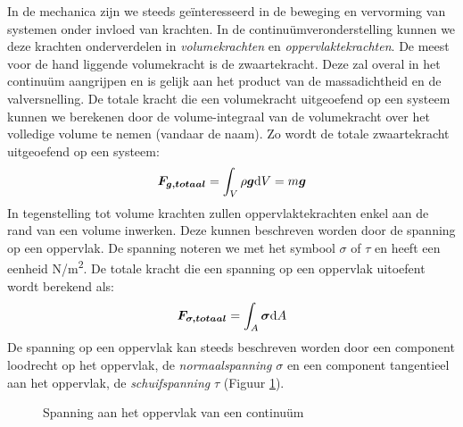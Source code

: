 In de mechanica zijn we steeds geïnteresseerd in de beweging en vervorming van systemen onder invloed van krachten. In de continuümveronderstelling kunnen we deze krachten onderverdelen in \emph{volumekrachten} en \emph{oppervlaktekrachten}. De meest voor de hand liggende volumekracht is de zwaartekracht. Deze zal overal in het continuüm aangrijpen en is gelijk aan het product van de massadichtheid en de valversnelling. De totale kracht die een volumekracht uitgeoefend op een systeem kunnen we berekenen door de volume-integraal van de volumekracht over het volledige volume te nemen (vandaar de naam). Zo wordt de totale zwaartekracht uitgeoefend op een systeem:
\begin{equation}
	\boldsymbol{F_{g,totaal}} = \int_V \rho \boldsymbol{g} \mathrm{d} V = m \boldsymbol{g}
	\label{eqn:volumekracht}
\end{equation}
In tegenstelling tot volume krachten zullen oppervlaktekrachten enkel aan de rand van een volume inwerken. Deze kunnen beschreven worden door de spanning op een oppervlak. De spanning noteren we met het symbool $\sigma$ of $\tau$ en heeft een eenheid  \unit{N/m^2}. De totale kracht die een spanning op een oppervlak uitoefent wordt berekend als: 
\begin{equation}
	\boldsymbol{F_{\sigma,totaal}} = \int_A \boldsymbol{\sigma} \mathrm{d} A
	\label{eqn:oppervlaktekracht}
\end{equation}
De spanning op een oppervlak kan steeds beschreven worden door een component loodrecht op het oppervlak, de \emph{normaalspanning} $\sigma$ en een component tangentieel aan het oppervlak, de \emph{schuifspanning} $\tau$ (Figuur \ref{fig:spanning}).
\begin{figure}[htb]
	\centering
	
	\caption{Spanning aan het oppervlak van een continuüm}
	\label{fig:spanning}
\end{figure}

